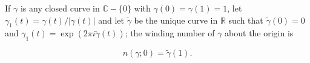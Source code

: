 If $\gamma$ is any closed curve in $\mathbb{C} - \{0\}$ with $\gamma(0) = \gamma(1) = 1$, let $\gamma_1(t) = \gamma(t)/|\gamma(t)|$ and let $\tilde{\gamma}$ be the unique curve in $\mathbb{R}$ such that $\tilde{\gamma}(0) = 0$ and $\gamma_1(t) = \exp(2\pi i \tilde{\gamma}(t))$; the winding number of $\gamma$ about the origin is

$$n(\gamma; 0) = \tilde{\gamma}(1).$$
